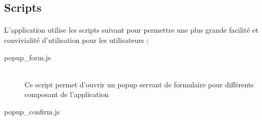     \subsection{Scripts}
        \paragraph{}
            L'application utilise les scripts suivant pour permettre une plus
            grande facilité et convivialité d'utilisation pour les
            utilisateurs :
        \begin{description}
            \item[popup\_form.js]\hfill \\
                Ce script permet d'ouvrir un popup servant de formulaire pour
                différents composant de l'application
            \item[popup\_confirm.js]\hfill \\



\end{description}
